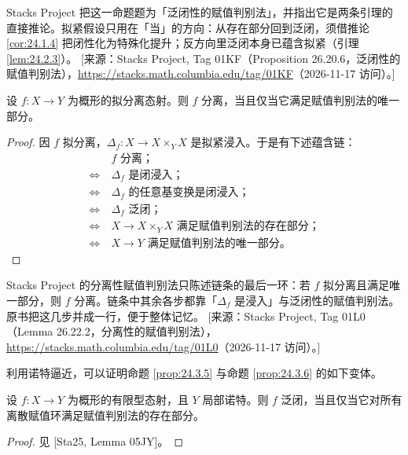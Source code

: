 \begin{yizhu}
Stacks Project 把这一命题题为「泛闭性的赋值判别法」，并指出它是两条引理的直接推论。拟紧假设只用在「当」的方向：从存在部分回到泛闭，须借推论 \ref{cor:24.1.4} 把闭性化为特殊化提升；反方向里泛闭本身已蕴含拟紧（引理 \ref{lem:24.2.3}）。
[来源：Stacks Project, Tag 01KF（Proposition 26.20.6，泛闭性的赋值判别法），\url{https://stacks.math.columbia.edu/tag/01KF}（2026-11-17 访问）。]
\end{yizhu}

\begin{proposition}\label{prop:24.3.6}
设 $f\colon X \to Y$ 为概形的拟分离态射。则 $f$ 分离，当且仅当它满足赋值判别法的唯一部分。
\end{proposition}

\begin{proof}
因 $f$ 拟分离，$\Delta_f\colon X \to X \times_Y X$ 是拟紧浸入。于是有下述蕴含链：
\[
\begin{aligned}
& f \text{ 分离；}\\
\Leftrightarrow\ & \Delta_f \text{ 是闭浸入；}\\
\Leftrightarrow\ & \Delta_f \text{ 的任意基变换是闭浸入；}\\
\Leftrightarrow\ & \Delta_f \text{ 泛闭；}\\
\Leftrightarrow\ & X \to X \times_Y X \text{ 满足赋值判别法的存在部分；}\\
\Leftrightarrow\ & X \to Y \text{ 满足赋值判别法的唯一部分。}
\end{aligned}
\]
\end{proof}

\begin{yizhu}
Stacks Project 的分离性赋值判别法只陈述链条的最后一环：若 $f$ 拟分离且满足唯一部分，则 $f$ 分离。链条中其余各步都靠「$\Delta_f$ 是浸入」与泛闭性的赋值判别法。原书把这几步并成一行，便于整体记忆。
[来源：Stacks Project, Tag 01L0（Lemma 26.22.2，分离性的赋值判别法），\url{https://stacks.math.columbia.edu/tag/01L0}（2026-11-17 访问）。]
\end{yizhu}

利用诺特逼近，可以证明命题 \ref{prop:24.3.5} 与命题 \ref{prop:24.3.6} 的如下变体。

\begin{proposition}\label{prop:24.3.7}
设 $f\colon X \to Y$ 为概形的有限型态射，且 $Y$ 局部诺特。则 $f$ 泛闭，当且仅当它对所有离散赋值环满足赋值判别法的存在部分。
\end{proposition}

\begin{proof}
见 [Sta25, Lemma 05JY]。
\end{proof}


